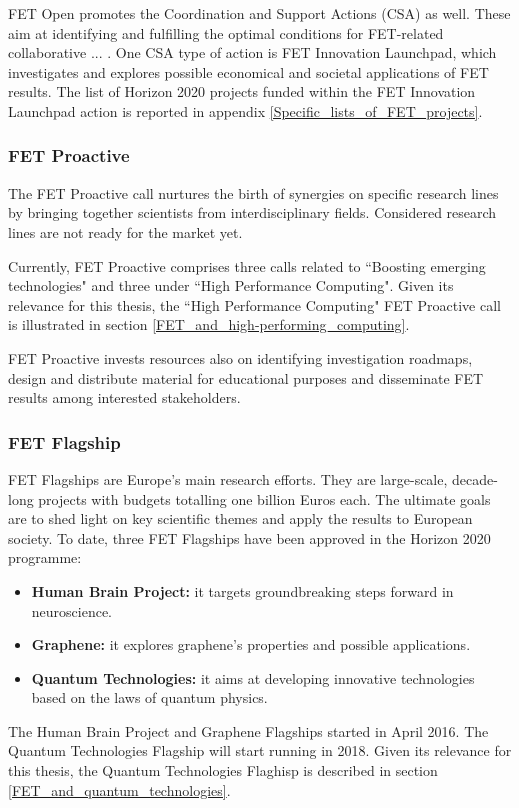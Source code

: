 FET Open promotes the Coordination and Support Actions (CSA) as well. These aim at identifying and fulfilling the optimal conditions for FET-related collaborative ... . One CSA type of action is FET Innovation Launchpad, which investigates and explores possible economical and societal applications of FET results. The list of Horizon 2020 projects funded within the FET Innovation Launchpad action is reported in appendix \ref{Specific_lists_of_FET_projects}. 

\subsubsection{FET Proactive}
The FET Proactive call nurtures the birth of synergies on specific research lines by bringing together scientists from interdisciplinary fields. Considered research lines are not ready for the market yet.    

Currently, FET Proactive comprises three calls related to ``Boosting emerging technologies" and three under ``High Performance Computing". Given its relevance for this thesis, the ``High Performance Computing" FET Proactive call is illustrated in section \ref{FET_and_high-performing_computing}. 

FET Proactive invests resources also on identifying investigation roadmaps, design and distribute material for educational purposes and disseminate FET results among interested stakeholders.  

\subsubsection{FET Flagship}
FET Flagships are Europe's main research efforts. They are large-scale, decade-long projects with budgets totalling one billion Euros each. The ultimate goals are to shed light on key scientific themes and apply the results to European society. To date, three FET Flagships have been approved in the Horizon 2020 programme: 

\begin{itemize}
 \item \textbf{Human Brain Project:} it targets groundbreaking steps forward in neuroscience.
 \item \textbf{Graphene:} it explores graphene's properties and possible applications.
 \item \textbf{Quantum Technologies:} it aims at developing innovative technologies based on the laws of quantum physics.
\end{itemize}
The Human Brain Project and Graphene Flagships started in April 2016. The Quantum Technologies Flagship will start running in 2018. Given its relevance for this thesis, the Quantum Technologies Flaghisp is described in section \ref{FET_and_quantum_technologies}.

